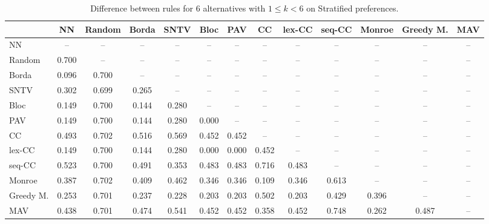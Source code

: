 
\begin{table*}[h!]
\centering
\begin{tabular}{lcccccccccccc}
\toprule
 & NN & Random & Borda & SNTV & Bloc & PAV & CC & lex-CC & seq-CC & Monroe & Greedy M. & MAV \\
\midrule
NN & -- & -- & -- & -- & -- & -- & -- & -- & -- & -- & -- & -- \\
Random & 0.700 & -- & -- & -- & -- & -- & -- & -- & -- & -- & -- & -- \\
Borda & 0.096 & 0.700 & -- & -- & -- & -- & -- & -- & -- & -- & -- & -- \\
SNTV & 0.302 & 0.699 & 0.265 & -- & -- & -- & -- & -- & -- & -- & -- & -- \\
Bloc & 0.149 & 0.700 & 0.144 & 0.280 & -- & -- & -- & -- & -- & -- & -- & -- \\
PAV & 0.149 & 0.700 & 0.144 & 0.280 & 0.000 & -- & -- & -- & -- & -- & -- & -- \\
CC & 0.493 & 0.702 & 0.516 & 0.569 & 0.452 & 0.452 & -- & -- & -- & -- & -- & -- \\
lex-CC & 0.149 & 0.700 & 0.144 & 0.280 & 0.000 & 0.000 & 0.452 & -- & -- & -- & -- & -- \\
seq-CC & 0.523 & 0.700 & 0.491 & 0.353 & 0.483 & 0.483 & 0.716 & 0.483 & -- & -- & -- & -- \\
Monroe & 0.387 & 0.702 & 0.409 & 0.462 & 0.346 & 0.346 & 0.109 & 0.346 & 0.613 & -- & -- & -- \\
Greedy M. & 0.253 & 0.701 & 0.237 & 0.228 & 0.203 & 0.203 & 0.502 & 0.203 & 0.429 & 0.396 & -- & -- \\
MAV & 0.438 & 0.701 & 0.474 & 0.541 & 0.452 & 0.452 & 0.358 & 0.452 & 0.748 & 0.262 & 0.487 & -- \\
\bottomrule
\end{tabular}

\caption{Difference between rules for 6 alternatives with $1 \leq k < 6$ on Stratified preferences.}
\end{table*}
